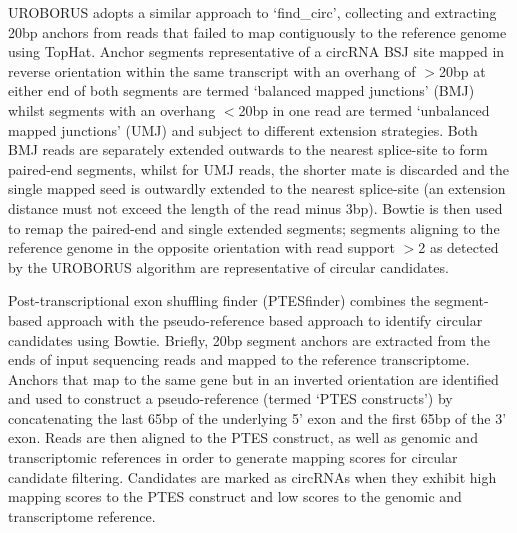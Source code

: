 \documentclass[pdflatex,sn-mathphys-num]{sn-jnl}
\begin{document}
UROBORUS \cite{UROBORUS} adopts a similar approach to `find\_circ', collecting and extracting 20bp anchors from reads that failed to map contiguously to the reference genome using TopHat. Anchor segments representative of a circRNA BSJ site mapped in reverse orientation within the same transcript with an overhang of $>$20bp at either end of both segments are termed `balanced mapped junctions' (BMJ) whilst segments with an overhang $<$20bp in one read are termed `unbalanced mapped junctions' (UMJ) and subject to different extension strategies. Both BMJ reads are separately extended outwards to the nearest splice-site to form paired-end segments, whilst for UMJ reads, the shorter mate is discarded and the single mapped seed is outwardly extended to the nearest splice-site (an extension distance must not exceed the length of the read minus 3bp). Bowtie is then used to remap the paired-end and single extended segments; segments aligning to the reference genome in the opposite orientation with read support $>$2 as detected by the UROBORUS algorithm are representative of circular candidates. \par
Post-transcriptional exon shuffling finder (PTESfinder) \cite{PTESfinder} combines the segment-based approach with the pseudo-reference based approach to identify circular candidates using Bowtie. Briefly, 20bp segment anchors are extracted from the ends of input sequencing reads and mapped to the reference transcriptome. Anchors that map to the same gene but in an inverted orientation are identified and used to construct a pseudo-reference (termed `PTES constructs') by concatenating the last 65bp of the underlying 5' exon and the first 65bp of the 3' exon. Reads are then aligned to the PTES construct, as well as genomic and transcriptomic references in order to generate mapping scores for circular candidate filtering. Candidates are marked as circRNAs when they exhibit high mapping scores to the PTES construct and low scores to the genomic and transcriptome reference. \par 
\end{document}
